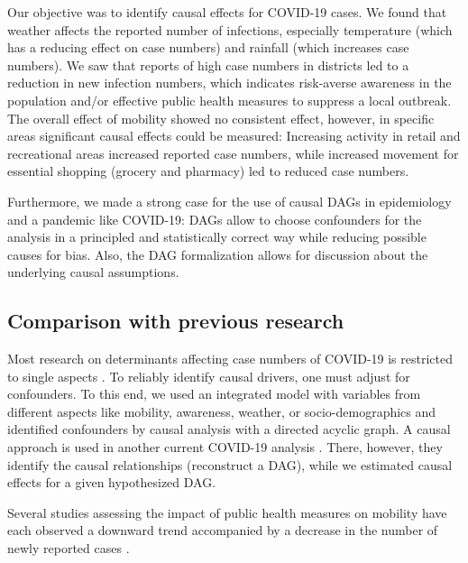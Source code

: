 \documentclass[]{elsarticle} %
\begin{document}
Our objective was to identify causal effects for COVID-19 cases. We found that weather affects the reported number of infections, especially temperature (which has a reducing effect on case numbers) and rainfall (which increases case numbers). We saw that reports of high case numbers in districts led to a reduction in new infection numbers, which indicates risk-averse awareness in the population and/or effective public health measures to suppress a local outbreak. The overall effect of mobility showed no consistent effect, however, in specific areas significant causal effects could be measured: Increasing activity in retail and recreational areas increased reported case numbers, while increased movement for essential shopping (grocery and pharmacy) led to reduced case numbers.

Furthermore, we made a strong case for the use of causal DAGs in epidemiology and a pandemic like COVID-19: DAGs allow to choose confounders for the analysis in a principled and statistically correct way while reducing possible causes for bias. Also, the DAG formalization allows for discussion about the underlying causal assumptions.

\hypertarget{comparison-with-previous-research}{%
\subsection{Comparison with previous research}\label{comparison-with-previous-research}}

Most research on determinants affecting case numbers of COVID-19 is restricted to single aspects \citep{fowler_effect_2020, li_retrospective_2020, shi_impact_2020, Wang2020temperature}. To reliably identify causal drivers, one must adjust for confounders. To this end, we used an integrated model with variables from different aspects like mobility, awareness, weather, or socio-demographics and identified confounders by causal analysis with a directed acyclic graph. A causal approach is used in another current COVID-19 analysis \citep{gencoglu2020causal}. There, however, they identify the causal relationships (reconstruct a DAG), while we estimated causal effects for a given hypothesized DAG.

Several studies assessing the impact of public health measures on mobility have each observed a downward trend accompanied by a decrease in the number of newly reported cases \citep{chang_modeling_2020, cowling2020impact, fowler_effect_2020, kraemer_effect_2020, lai_effect_2020, linka_outbreak_2020}.
\end{document}
